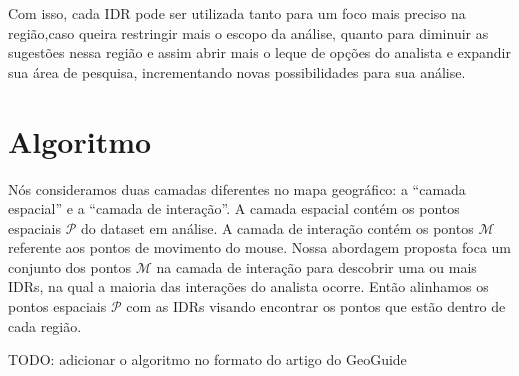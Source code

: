 Com isso, cada IDR pode ser utilizada tanto para um foco mais preciso na região,caso queira restringir mais o escopo da análise, quanto para diminuir as sugestões nessa região e assim abrir mais o leque de opções do analista e expandir sua área de pesquisa, incrementando novas possibilidades para sua análise.

\section{Algoritmo}

Nós consideramos duas camadas diferentes no mapa geográfico: a ``camada espacial'' e a ``camada de interação''. A camada espacial contém os pontos espaciais $\mathcal{P}$ do dataset em análise. A camada de interação  contém os pontos $\mathcal{M}$ referente aos pontos de movimento do mouse. Nossa abordagem proposta foca um conjunto dos pontos $\mathcal{M}$ na camada de interação para descobrir uma ou mais IDRs, na qual a maioria das interações do analista ocorre. Então alinhamos os pontos espaciais $\mathcal{P}$ com as IDRs visando encontrar os pontos que estão dentro de cada região. 

TODO: adicionar o algoritmo no formato do artigo do GeoGuide


